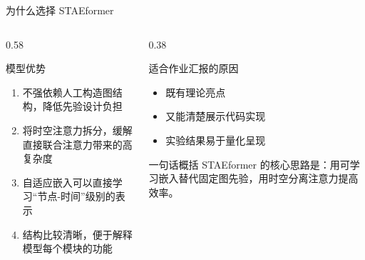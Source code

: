 \documentclass[10pt,aspectratio=169]{ctexbeamer}
\begin{document}
\begin{frame}{为什么选择 STAEformer}
  \begin{columns}[T]
    \begin{column}{0.58\textwidth}
      \begin{block}{模型优势}
        \begin{enumerate}
          \item 不强依赖人工构造图结构，降低先验设计负担
          \item 将时空注意力拆分，缓解直接联合注意力带来的高复杂度
          \item 自适应嵌入可以直接学习“节点-时间”级别的表示
          \item 结构比较清晰，便于解释模型每个模块的功能
        \end{enumerate}
      \end{block}
    \end{column}
    \begin{column}{0.38\textwidth}
      \begin{alertblock}{适合作业汇报的原因}
        \begin{itemize}
          \item 既有理论亮点
          \item 又能清楚展示代码实现
          \item 实验结果易于量化呈现
        \end{itemize}
      \end{alertblock}

      \begin{exampleblock}{一句话概括}
        STAEformer 的核心思路是：用可学习嵌入替代固定图先验，用时空分离注意力提高效率。
      \end{exampleblock}
    \end{column}
  \end{columns}
\end{frame}
\end{document}
